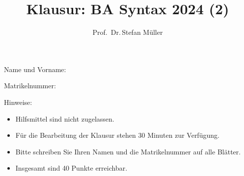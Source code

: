 \documentclass[fleqn,10pt,a4paper]{article}
\title{Klausur: BA Syntax 2024 (2)}
\author{Prof.\ Dr.\,Stefan Müller}
\begin{document}
\maketitle


\noindent
Name und Vorname:

\noindent
Matrikelnummer: 

\medskip
\noindent
Hinweise:
\begin{itemize}
\item Hilfsmittel sind nicht zugelassen.
\item Für die Bearbeitung der Klausur stehen 30 Minuten zur Verfügung.
\item Bitte schreiben Sie Ihren Namen und die Matrikelnummer auf alle Blätter.
\item Insgesamt sind 40 Punkte erreichbar. 

\end{itemize}
\end{document}
